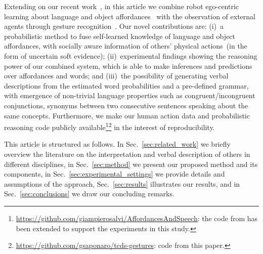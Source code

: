 Extending on our recent work~\cite{saponaro:2017:glu}, in this article we combine robot ego-centric learning about language and object affordances~\cite{salvi:2012:smcb} with the observation of external agents through gesture recognition~\cite{saponaro:2013:crhri}.
Our novel contributions are:
(i)~a probabilistic method to fuse self-learned knowledge of language and object affordances, with socially aware information of others' physical actions~(in the form of uncertain soft evidence);
(ii)~experimental findings showing the reasoning power of our combined system, which is able to make inferences and predictions over affordances and words; and
(iii)~the possibility of generating verbal descriptions from the estimated word probabilities and a pre-defined grammar, with emergence of non-trivial language properties such as congruent/incongruent conjunctions, synonyms between two consecutive sentences speaking about the same concepts.
Furthermore, we make our human action data and probabilistic reasoning code publicly available\footnote{\url{https://github.com/giampierosalvi/AffordancesAndSpeech}: the code from \cite{salvi:2012:smcb} has been extended to support the experiments in this study.}\footnote{\url{https://github.com/gsaponaro/tcds-gestures}: code from this paper.} in the interest of reproducibility.

This article is structured as follows.
In Sec.~\ref{sec:related_work} we briefly overview the literature on the interpretation and verbal description of others in different disciplines,
in Sec.~\ref{sec:method} we present our proposed method and its components,
in Sec.~\ref{sec:experimental_settings} we provide details and assumptions of the approach,
Sec.~\ref{sec:results} illustrates our results, and
in Sec.~\ref{sec:conclusions} we draw our concluding remarks.
